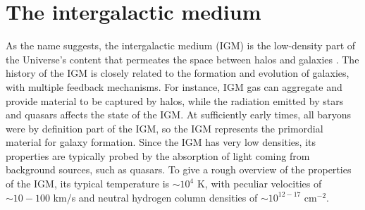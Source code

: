 \section{The intergalactic medium}\label{sec:IGM}
As the name suggests, the intergalactic medium (IGM) is the low-density part of the Universe's content that permeates the space between halos and galaxies \cite{Mo2010}. The history of the IGM is closely related to the formation and evolution of galaxies, with multiple feedback mechanisms. For instance, IGM gas can aggregate and provide material to be captured by halos, while the radiation emitted by stars and quasars affects the state of the IGM. At sufficiently early times, all baryons were by definition part of the IGM, so the IGM represents the primordial material for galaxy formation. Since the IGM has very low densities, its properties are typically probed by the absorption of light coming from background sources, such as quasars. To give a rough overview of the properties of the IGM, its typical temperature is $\sim 10^4$ K, with peculiar velocities of $\sim 10-100$ km/s and neutral hydrogen column densities of $\sim 10^{12-17}$ cm$^{-2}$.

